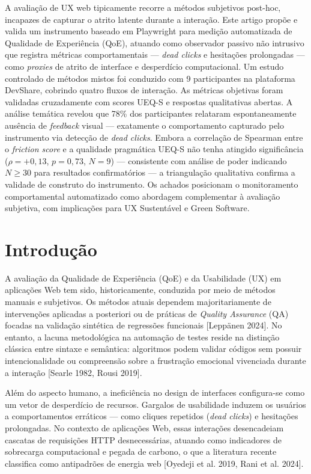 \documentclass[12pt]{article}
\begin{document}
\begin{resumo}
A avaliação de UX web tipicamente recorre a métodos subjetivos post-hoc,
incapazes de capturar o atrito latente durante a interação. Este artigo propõe
e valida um instrumento baseado em Playwright para medição automatizada de
Qualidade de Experiência (QoE), atuando como observador passivo não intrusivo
que registra métricas comportamentais --- \textit{dead clicks} e hesitações
prolongadas --- como \textit{proxies} de atrito de interface e desperdício
computacional. Um estudo controlado de métodos mistos foi conduzido com 9
participantes na plataforma DevShare, cobrindo quatro fluxos de interação. As
métricas objetivas foram validadas cruzadamente com scores UEQ-S e respostas
qualitativas abertas. A análise temática revelou que 78\% dos participantes
relataram espontaneamente ausência de \textit{feedback} visual --- exatamente
o comportamento capturado pelo instrumento via detecção de \textit{dead
clicks}. Embora a correlação de Spearman entre o \textit{friction score} e a
qualidade pragmática UEQ-S não tenha atingido significância ($\rho = +0{,}13$,
$p = 0{,}73$, $N = 9$) --- consistente com análise de poder indicando
$N \geq 30$ para resultados confirmatórios --- a triangulação qualitativa
confirma a validade de construto do instrumento. Os achados posicionam o
monitoramento comportamental automatizado como abordagem complementar à
avaliação subjetiva, com implicações para UX Sustentável e Green Software.
\end{resumo}

\section{Introdução}

A avaliação da Qualidade de Experiência (QoE) e da Usabilidade (UX) em aplicações Web tem sido, historicamente, conduzida por meio de métodos manuais e subjetivos. Os métodos atuais dependem majoritariamente de intervenções aplicadas a posteriori ou de práticas de \textit{Quality Assurance} (QA) focadas na validação sintética de regressões funcionais [Leppänen 2024]. No entanto, a lacuna metodológica na automação de testes reside na distinção clássica entre sintaxe e semântica: algoritmos podem validar códigos sem possuir intencionalidade ou compreensão sobre a frustração emocional vivenciada durante a interação [Searle 1982, Rousi 2019].

Além do aspecto humano, a ineficiência no design de interfaces configura-se como um vetor de desperdício de recursos. Gargalos de usabilidade induzem os usuários a comportamentos erráticos --- como cliques repetidos (\textit{dead clicks}) e hesitações prolongadas. No contexto de aplicações Web, essas interações desencadeiam cascatas de requisições HTTP desnecessárias, atuando como indicadores de sobrecarga computacional e pegada de carbono, o que a literatura recente classifica como antipadrões de energia web [Oyedeji et al. 2019, Rani et al. 2024].
\end{document}
